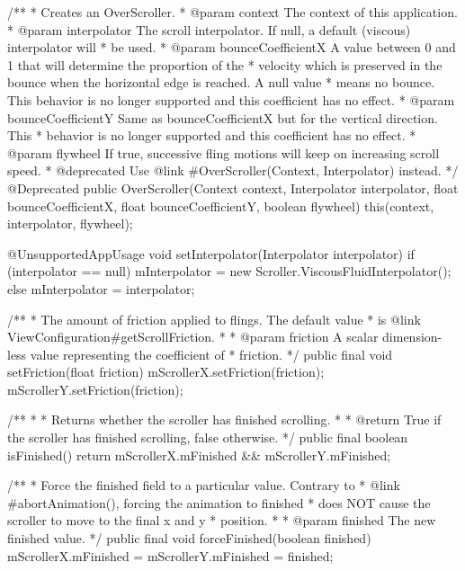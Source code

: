 {    /**
     * Creates an OverScroller.
     * @param context The context of this application.
     * @param interpolator The scroll interpolator. If null, a default (viscous) interpolator will
     * be used.
     * @param bounceCoefficientX A value between 0 and 1 that will determine the proportion of the
     * velocity which is preserved in the bounce when the horizontal edge is reached. A null value
     * means no bounce. This behavior is no longer supported and this coefficient has no effect.
     * @param bounceCoefficientY Same as bounceCoefficientX but for the vertical direction. This
     * behavior is no longer supported and this coefficient has no effect.
     * @param flywheel If true, successive fling motions will keep on increasing scroll speed.
     * @deprecated Use {@link #OverScroller(Context, Interpolator)} instead.
     */
    @Deprecated
    public OverScroller(Context context, Interpolator interpolator,
            float bounceCoefficientX, float bounceCoefficientY, boolean flywheel) {
        this(context, interpolator, flywheel);
    }

    @UnsupportedAppUsage
    void setInterpolator(Interpolator interpolator) {
        if (interpolator == null) {
            mInterpolator = new Scroller.ViscousFluidInterpolator();
        } else {
            mInterpolator = interpolator;
        }
    }

    /**
     * The amount of friction applied to flings. The default value
     * is {@link ViewConfiguration#getScrollFriction}.
     *
     * @param friction A scalar dimension-less value representing the coefficient of
     *         friction.
     */
    public final void setFriction(float friction) {
        mScrollerX.setFriction(friction);
        mScrollerY.setFriction(friction);
    }

    /**
     *
     * Returns whether the scroller has finished scrolling.
     *
     * @return True if the scroller has finished scrolling, false otherwise.
     */
    public final boolean isFinished() {
        return mScrollerX.mFinished && mScrollerY.mFinished;
    }

    /**
     * Force the finished field to a particular value. Contrary to
     * {@link #abortAnimation()}, forcing the animation to finished
     * does NOT cause the scroller to move to the final x and y
     * position.
     *
     * @param finished The new finished value.
     */
    public final void forceFinished(boolean finished) {
        mScrollerX.mFinished = mScrollerY.mFinished = finished;
    }

}
